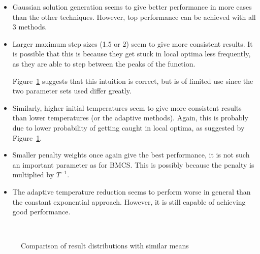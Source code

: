 \documentclass[10pt]{article}
\begin{document}
\begin{itemize}
  \item Gaussian solution generation seems to give better performance in more
    cases than the other techniques. However, top performance can be achieved
    with all 3 methods.
  \item Larger maximum step sizes (1.5 or 2) seem to give more consistent
    results. It is possible that this is because they get stuck in local
    optima less frequently, as they are able to step between the peaks of the
    function.

    Figure~\ref{fig:mean_var} suggests that this intuition is correct, but is
    of limited use since the two parameter sets used differ greatly.

  \item Similarly, higher initial temperatures seem to give more consistent
    results than lower temperatures (or the adaptive methods). Again, this is
    probably due to lower probability of getting caught in local optima, as
    suggested by Figure~\ref{fig:mean_var}.
  \item Smaller penalty weights once again give the best performance, it is
    not such an important parameter as for BMCS. This is possibly because the
    penalty is multiplied by $T^{-1}$.
  \item The adaptive temperature reduction seems to perform worse in general
    than the constant exponential approach. However, it is still capable of
    achieving good performance.
    \end{itemize}

\begin{figure}
  \begin{center}
    \mbox{
    }
    \end{center}
    \caption{Comparison of result distributions with similar means}
    \label{fig:mean_var}
    \end{figure}
\end{document}
